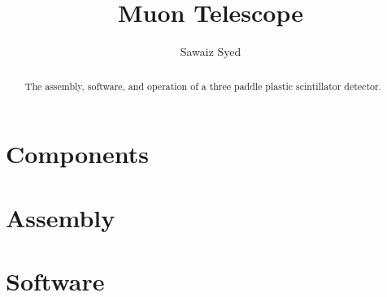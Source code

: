 \documentclass[12pt]{report}
\title{Muon Telescope}
\author{Sawaiz Syed}
\begin{document}
\maketitle 
\tableofcontents{}

\begin{abstract}
    The assembly, software, and operation of a three paddle plastic scintillator detector. 
\end{abstract}

\pagebreak
\chapter{Components}





\chapter{Assembly}

\chapter{Software}



%
%
%
%

\pagebreak
\end{document}
